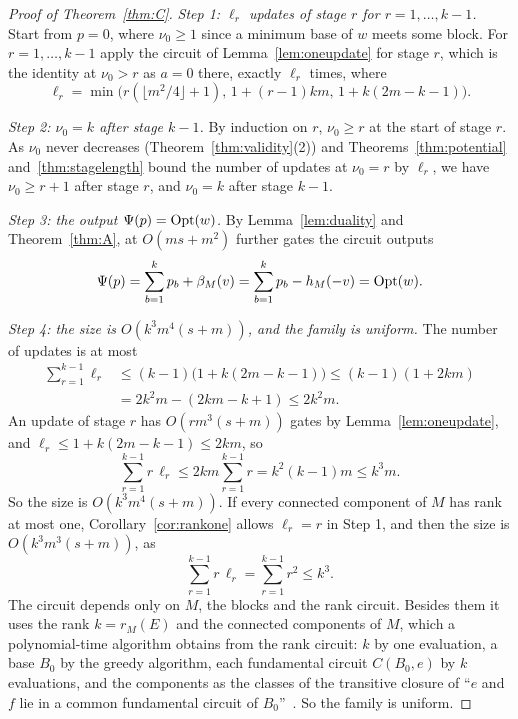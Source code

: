 \begin{proof}[Proof of Theorem~\ref{thm:C}]
\emph{Step 1: $\ell_r$ updates of stage $r$ for $r=1,\ldots,k-1$.}  Start from $p=0$, where $\nu_0\ge1$ since a minimum
base of $w$ meets some block.  For $r=1,\ldots,k-1$ apply the circuit of
Lemma~\ref{lem:oneupdate} for stage $r$, which is the identity at $\nu_0>r$ as
$a=0$ there, exactly $\ell_r$ times, where
\[
  \ell_r=\min\bigl(r(\lfloor m^{2}/4\rfloor+1),\,1+(r-1)km,\,1+k(2m-k-1)\bigr).
\]

\emph{Step 2: $\nu_0=k$ after stage $k-1$.}  By induction on $r$, $\nu_0\ge r$ at the start of
stage $r$.  As $\nu_0$ never decreases (Theorem~\ref{thm:validity}(2)) and
Theorems~\ref{thm:potential} and~\ref{thm:stagelength} bound the number of
updates at $\nu_0=r$ by $\ell_r$, we have $\nu_0\ge r+1$ after stage $r$, and
$\nu_0=k$ after stage $k-1$.

\emph{Step 3: the output $\Psi(p)=\operatorname{Opt}(w)$.}  By Lemma~\ref{lem:duality} and Theorem~\ref{thm:A},
at $O(ms+m^{2})$ further gates the circuit outputs
\[
  \Psi(p)=\sum_{b=1}^{k}p_b+\beta_M(v)=\sum_{b=1}^{k}p_b-h_M(-v)=\operatorname{Opt}(w).
\]

\emph{Step 4: the size is $O(k^{3}m^{4}(s+m))$, and the family is uniform.}  The number of updates is at most
\[
  \begin{aligned}
  \sum_{r=1}^{k-1}\ell_r&\le(k-1)\bigl(1+k(2m-k-1)\bigr)\le(k-1)(1+2km)\\
  &=2k^{2}m-(2km-k+1)\le2k^{2}m.
  \end{aligned}
\]
An update of stage $r$ has $O(rm^{3}(s+m))$ gates by Lemma~\ref{lem:oneupdate},
and $\ell_r\le1+k(2m-k-1)\le2km$, so
\[
  \sum_{r=1}^{k-1}r\,\ell_r\le2km\sum_{r=1}^{k-1}r=k^{2}(k-1)m\le k^{3}m.
\]
So the size is $O(k^{3}m^{4}(s+m))$.  If every connected component of $M$ has
rank at most one, Corollary~\ref{cor:rankone} allows $\ell_r=r$ in Step 1, and then the size is $O(k^{3}m^{3}(s+m))$, as
\[
  \sum_{r=1}^{k-1}r\,\ell_r=\sum_{r=1}^{k-1}r^{2}\le k^{3}.
\]  The circuit depends only on $M$, the
blocks and the rank circuit.  Besides them it uses the rank $k=r_M(E)$ and the
connected components of $M$, which a polynomial-time algorithm obtains from the
rank circuit: $k$ by one evaluation, a base $B_0$ by the greedy algorithm, each
fundamental circuit $C(B_0,e)$ by $k$ evaluations, and the components as the
classes of the transitive closure of ``$e$ and $f$ lie in a common fundamental
circuit of $B_0$''~\cite{oxley11}.  So the family is uniform.
\end{proof}

